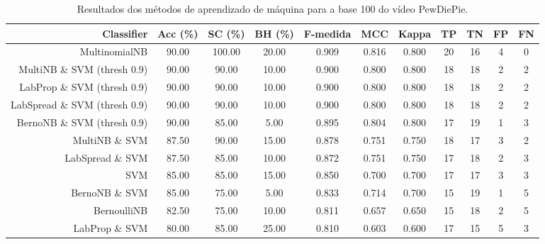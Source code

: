 \begin{table}[!htb]
\centering
\caption{Resultados dos métodos de aprendizado de máquina para a base 100 do vídeo PewDiePie.}
\label{tab:PewDiePie-100}
\begin{tabular}{r|c|c|c|c|c|c|c|c|c|c}
\hline\hline
Classifier & Acc (\%) & SC (\%) & BH (\%) & F-medida & MCC & Kappa & TP & TN & FP & FN \\ \hline
MultinomialNB & 90.00 & 100.00 & 20.00 & 0.909 & 0.816 & 0.800 & 20 & 16 & 4 & 0 \\ 
MultiNB \& SVM (thresh 0.9) & 90.00 & 90.00 & 10.00 & 0.900 & 0.800 & 0.800 & 18 & 18 & 2 & 2 \\ 
LabProp \& SVM (thresh 0.9) & 90.00 & 90.00 & 10.00 & 0.900 & 0.800 & 0.800 & 18 & 18 & 2 & 2 \\ 
LabSpread \& SVM (thresh 0.9) & 90.00 & 90.00 & 10.00 & 0.900 & 0.800 & 0.800 & 18 & 18 & 2 & 2 \\ 
BernoNB \& SVM (thresh 0.9) & 90.00 & 85.00 & 5.00 & 0.895 & 0.804 & 0.800 & 17 & 19 & 1 & 3 \\ 
MultiNB \& SVM & 87.50 & 90.00 & 15.00 & 0.878 & 0.751 & 0.750 & 18 & 17 & 3 & 2 \\ 
LabSpread \& SVM & 87.50 & 85.00 & 10.00 & 0.872 & 0.751 & 0.750 & 17 & 18 & 2 & 3 \\ 
SVM & 85.00 & 85.00 & 15.00 & 0.850 & 0.700 & 0.700 & 17 & 17 & 3 & 3 \\ 
BernoNB \& SVM & 85.00 & 75.00 & 5.00 & 0.833 & 0.714 & 0.700 & 15 & 19 & 1 & 5 \\ 
BernoulliNB & 82.50 & 75.00 & 10.00 & 0.811 & 0.657 & 0.650 & 15 & 18 & 2 & 5 \\ 
LabProp \& SVM & 80.00 & 85.00 & 25.00 & 0.810 & 0.603 & 0.600 & 17 & 15 & 5 & 3 \\ 
\hline\hline
\end{tabular}
\end{table}

